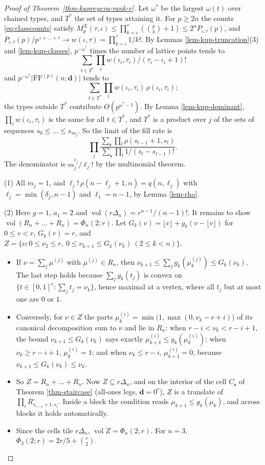 \documentclass[11pt, a4paper, abstract=yes]{scrartcl}
\theoremstyle{definition}
\theoremstyle{remark}
\theoremstyle{plain}
\newcommand{\vek}[1]{\boldsymbol{#1}}
\theoremstyle{remark}
\theoremstyle{plain}
\newcommand{\FF}{\mathrm{FF}}
\newcommand{\vol}{\operatorname{vol}}
\begin{document}
\begin{proof}[Proof of Theorem~\ref{thm-kupreyeva-rank-r}]
Let \(\omega^*\) be the largest \(\omega(t)\) over chained types, and \(T^*\) the set of types attaining it.
For \(p\ge2n\) the counts \eqref{eq:classcounts} satisfy
\(M^X_p(\tau,\iota)\le\prod_{k=\iota}^\tau(\binom pk+1)\le2^nP_{\iota,\tau}(p)\), and
\(P_{\iota,\tau}(p)/p^{\,\iota+\dots+\tau}\to w(\iota,\tau)=\prod_{k=\iota}^\tau1/k!\). By
Lemmas \ref{lem-kup-truncation}(3) and \ref{lem-kup-classes}, \(p^{-\omega^*}\) times the number of lattice
points tends to
\[
  \sum_{t\in T^*}\prod_iw(\iota_i,\tau_i)/(\tau_i-\iota_i+1)!
\]
and \(p^{-\omega^*}\lvert\FF^{(p)}(n;\vek d)\rvert\) tends to
\[
  \sum_{t\in T^*}\prod_iw(\iota_i,\tau_i)\,\rho(\iota_i,\tau_i);
\]
the types outside \(T^*\) contribute \(O(p^{\omega^*-1})\). By Lemma \ref{lem-kup-dominant},
\(\prod_iw(\iota_i,\tau_i)\) is the same for all \(t\in T^*\), and \(T^*\) is a product over \(j\)
of the sets of sequences \(s_0\le\dots\le s_{m_j}\). So the limit of the fill rate is
\[
  \prod_j\frac{\sum_{\vek s}\prod_l\rho(s_{l-1}+1,s_l)}{\sum_{\vek s}\prod_l1/(s_l-s_{l-1})!} .
\]
The denominator is \(m_j^{\ell_j}/\ell_j!\) by the multinomial theorem.

(1) All \(m_j=1\), and \(\ell_j!\,\rho(n-\ell_j+1,n)=q(n,\ell_j)\) with \(\ell_j=\min(\delta_j,n-1)\)
and \(\ell_1=n-1\), by Lemma \ref{lem-rho}.

(2) Here \(g=1\), \(a_1=2\) and \(\vol(r\Delta_n)=r^{n-1}/(n-1)!\). It remains to show
\(\vol(R_n+\dots+R_n)=\Phi_n(2;r)\). Let \(G_k(v)=\lfloor v\rfloor+g_k(v-\lfloor v\rfloor)\) for
\(0\le v<r\), \(G_k(r)=r\), and
\(Z=\lbrace\nu:0\le\nu_2\le r,\ 0\le\nu_{k+1}\le G_k(\nu_k)\ (2\le k<n)\rbrace\).
\begin{itemize}
\item If \(\nu=\sum_j\mu^{(j)}\) with \(\mu^{(j)}\in R_n\), then
\(\nu_{k+1}\le\sum_jg_k(\mu^{(j)}_k)\le G_k(\nu_k)\). The last step holds because
\(\sum_jg_k(t_j)\) is convex on \(\lbrace t\in[0,1]^r:\sum_jt_j=\nu_k\rbrace\), hence maximal at a
vertex, where all \(t_j\) but at most one are \(0\) or \(1\).
\item Conversely, for \(\nu\in Z\) the parts
\(\mu^{(i)}_k=\min\bigl(1,\max(0,\nu_k-r+i)\bigr)\) of its canonical decomposition sum to \(\nu\)
and lie in \(R_n\): when \(r-i<\nu_k<r-i+1\), the bound \(\nu_{k+1}\le G_k(\nu_k)\) says exactly
\(\mu^{(i)}_{k+1}\le g_k(\mu^{(i)}_k)\); when \(\nu_k\ge r-i+1\), \(\mu^{(i)}_k=1\); and when
\(\nu_k\le r-i\), \(\mu^{(i)}_{k+1}=0\), because \(\nu_{k+1}\le G_k(\nu_k)\le\nu_k\).
\item So \(Z=R_n+\dots+R_n\). Now \(Z\subseteq r\Delta_n\), and on the interior of the cell
\(C_{\vek s}\) of Theorem \ref{thm-staircase} (all-ones legs, \(\vek d=0^r\)), \(Z\) is a translate
of \(\prod_iR^\circ_{s_{i-1}+1,s_i}\). Inside a block the condition reads
\(\mu_{k+1}\le g_k(\mu_k)\), and across blocks it holds automatically.
\item Since the cells tile \(r\Delta_n\), \(\vol Z=\Phi_n(2;r)\). For \(n=3\),
\(\Phi_3(2;r)=2r/5+\binom r2\).
\end{itemize}
\end{proof}
\end{document}
